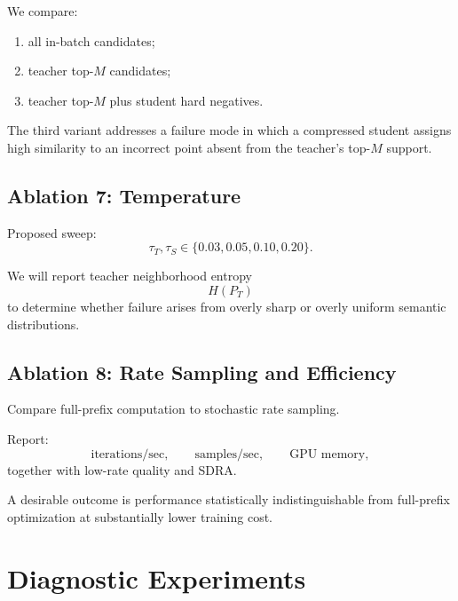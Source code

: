 \documentclass[11pt]{article}
\begin{document}
We compare:

\begin{enumerate}[leftmargin=1.5em]
    \item all in-batch candidates;
    \item teacher top-$M$ candidates;
    \item teacher top-$M$ plus student hard negatives.
\end{enumerate}

The third variant addresses a failure mode in which a compressed student assigns high similarity to an incorrect point absent from the teacher's top-$M$ support.


\subsection{Ablation 7: Temperature}

Proposed sweep:
\begin{equation}
    \tau_T,\tau_S
    \in
    \{
        0.03,0.05,0.10,0.20
    \}.
\end{equation}

We will report teacher neighborhood entropy
\begin{equation}
    H(P_T)
\end{equation}
to determine whether failure arises from overly sharp or overly uniform semantic distributions.


\subsection{Ablation 8: Rate Sampling and Efficiency}

Compare full-prefix computation to stochastic rate sampling.

Report:
\begin{equation}
    \text{iterations/sec},
    \qquad
    \text{samples/sec},
    \qquad
    \text{GPU memory},
\end{equation}
together with low-rate quality and SDRA.

A desirable outcome is performance statistically indistinguishable from full-prefix optimization at substantially lower training cost.


\section{Diagnostic Experiments}
\end{document}
